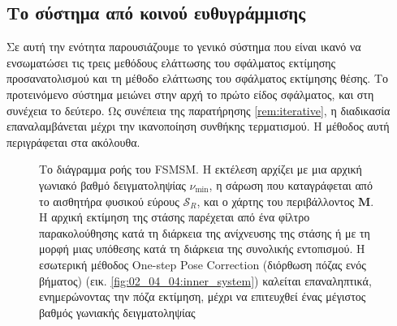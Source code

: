 \subsection{Το σύστημα από κοινού ευθυγράμμισης}


Σε αυτή την ενότητα παρουσιάζουμε το γενικό σύστημα που είναι ικανό να
ενσωματώσει τις τρεις μεθόδους ελάττωσης του σφάλματος εκτίμησης
προσανατολισμού και τη μέθοδο ελάττωσης του σφάλματος εκτίμησης θέσης.  Το
προτεινόμενο σύστημα μειώνει στην αρχή το πρώτο είδος σφάλματος, και στη
συνέχεια το δεύτερο. Ως συνέπεια της παρατήρησης \ref{rem:iterative}, η
διαδικασία επαναλαμβάνεται μέχρι την ικανοποίηση συνθήκης τερματισμού. Η
μέθοδος αυτή περιγράφεται στα ακόλουθα.


\begin{figure}[!h]\centering
  
  \caption{\small Το διάγραμμα ροής του FSMSM. Η εκτέλεση αρχίζει με μια αρχική
           γωνιακό βαθμό δειγματοληψίας $\nu_{\min}$, η σάρωση που καταγράφεται
           από το αισθητήρα φυσικού εύρους $\mathcal{S}_R$, και ο χάρτης του
           περιβάλλοντος $\bm{M}$. Η αρχική εκτίμηση της στάσης παρέχεται από
           ένα φίλτρο παρακολούθησης κατά τη διάρκεια της ανίχνευσης της στάσης
           ή με τη μορφή μιας υπόθεσης κατά τη διάρκεια της συνολικής
           εντοπισμού. Η εσωτερική μέθοδος One-step Pose Correction (διόρθωση
           πόζας ενός βήματος) (εικ. \ref{fig:02_04_04:inner_system}) καλείται
           επαναληπτικά, ενημερώνοντας την πόζα εκτίμηση, μέχρι να επιτευχθεί
           ένας μέγιστος βαθμός γωνιακής δειγματοληψίας}
  \label{fig:02_04_04:outer_system}
\end{figure}

